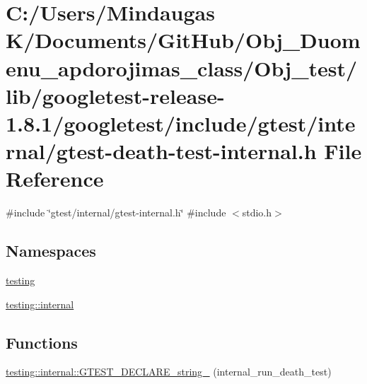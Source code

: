 \hypertarget{_obj__test_2lib_2googletest-release-1_88_81_2googletest_2include_2gtest_2internal_2gtest-death-test-internal_8h}{}\section{C\+:/\+Users/\+Mindaugas K/\+Documents/\+Git\+Hub/\+Obj\+\_\+\+Duomenu\+\_\+apdorojimas\+\_\+class/\+Obj\+\_\+test/lib/googletest-\/release-\/1.8.1/googletest/include/gtest/internal/gtest-\/death-\/test-\/internal.h File Reference}
\label{_obj__test_2lib_2googletest-release-1_88_81_2googletest_2include_2gtest_2internal_2gtest-death-test-internal_8h}
{\ttfamily \#include \char`\"{}gtest/internal/gtest-\/internal.\+h\char`\"{}}\newline
{\ttfamily \#include $<$stdio.\+h$>$}\newline
\subsection*{Namespaces}
\begin{DoxyCompactItemize}
\item 
 \mbox{\hyperlink{namespacetesting}{testing}}
\item 
 \mbox{\hyperlink{namespacetesting_1_1internal}{testing\+::internal}}
\end{DoxyCompactItemize}
\subsection*{Functions}
\begin{DoxyCompactItemize}
\item 
\mbox{\hyperlink{namespacetesting_1_1internal_ac20f635c3285878fc1195ce687f23950}{testing\+::internal\+::\+G\+T\+E\+S\+T\+\_\+\+D\+E\+C\+L\+A\+R\+E\+\_\+string\+\_\+}} (internal\+\_\+run\+\_\+death\+\_\+test)
\end{DoxyCompactItemize}
